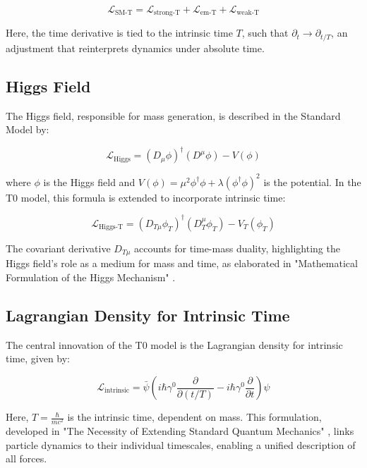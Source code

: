 \documentclass[a4paper,12pt]{article}
\begin{document}
	\begin{equation}
		\mathcal{L}_\text{SM-T} = \mathcal{L}_\text{strong-T} + \mathcal{L}_\text{em-T} + \mathcal{L}_\text{weak-T}
	\end{equation}
	
	Here, the time derivative is tied to the intrinsic time \(T\), such that \(\partial_t \rightarrow \partial_{t/T}\), an adjustment that reinterprets dynamics under absolute time.
	
	\subsection{Higgs Field}
	
	The Higgs field, responsible for mass generation, is described in the Standard Model by:
	
	\begin{equation}
		\mathcal{L}_\text{Higgs} = (D_\mu \phi)^\dagger (D^\mu \phi) - V(\phi)
	\end{equation}
	
	where \(\phi\) is the Higgs field and \(V(\phi) = \mu^2 \phi^\dagger \phi + \lambda (\phi^\dagger \phi)^2\) is the potential. In the T0 model, this formula is extended to incorporate intrinsic time:
	
	\begin{equation}
		\mathcal{L}_\text{Higgs-T} = (D_{T\mu} \phi_T)^\dagger (D_T^\mu \phi_T) - V_T(\phi_T)
	\end{equation}
	
	The covariant derivative \(D_{T\mu}\) accounts for time-mass duality, highlighting the Higgs field’s role as a medium for mass and time, as elaborated in "Mathematical Formulation of the Higgs Mechanism" \cite{pascher_higgs_2025}.
	
	\subsection{Lagrangian Density for Intrinsic Time}
	
	The central innovation of the T0 model is the Lagrangian density for intrinsic time, given by:
	
	\begin{equation}
		\mathcal{L}_\text{intrinsic} = \bar{\psi} \left( i\hbar \gamma^0 \frac{\partial}{\partial (t/T)} - i\hbar \gamma^0 \frac{\partial}{\partial t} \right) \psi
	\end{equation}
	
	Here, \(T = \frac{\hbar}{m c^2}\) is the intrinsic time, dependent on mass. This formulation, developed in "The Necessity of Extending Standard Quantum Mechanics" \cite{pascher_quantum_2025}, links particle dynamics to their individual timescales, enabling a unified description of all forces.
	
\end{document}
